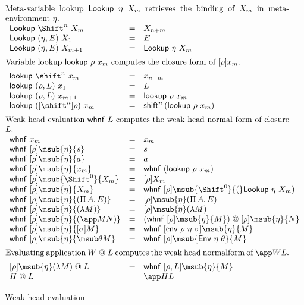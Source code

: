 \documentclass[copyright,creativecommons]{eptcs}
\makeatletter
\newcommand{\shiftby}[1]{\shift^{#1}}
\newcommand{\Shiftby}[1]{\Shift^{#1}}
\newcommand{\mId}{\Shiftby 0}
\newcommand{\esub}[1]{[#1]}
\newcommand{\msubp}[2]{\msub{#1}(#2)}
\newcommand{\dsub}[3]{\esub{#1}{\msub{#2}{#3}}} \newcommand{\dsubp}[3]{\esub{#1}{\msubp{#2}{#3}}} \newcommand{\fun}[1]{\Pi\,#1.\,}
\newcommand{\aboxiii}[1]{\multicolumn 3 {@{}p{\textwidth}@{}} {#1}}
\newcommand{\tlookup}{\mathsf{lookup}}
\newcommand{\wlookup}[2]{\tlookup~#1~{x_{#2}}}
\newcommand{\wlookupp}[2]{\wlookup{(#1)}{#2}}
\newcommand{\tLookup}{\mathsf{Lookup}}
\newcommand{\wmlookup}[2]{\tLookup~#1~{X_{#2}}}
\newcommand{\wmlookupp}[2]{\wmlookup{(#1)}{#2}}
\newcommand{\twhnf}{\mathsf{whnf}}
\newcommand{\twhnfp}[1]{\twhnf~(#1)}
\newcommand{\whnf}[3]{\twhnf~\dsub{#1}{#2}{#3}}
\newcommand{\whnfp}[3]{\whnf{#1}{#2}{(#3)}}
\newcommand{\twsub}{\mathsf{env}}
\newcommand{\wsub}[3]{\twsub~#1~#2~#3}
\newcommand{\twmsub}{\mathsf{Env}}
\newcommand{\wmsub}[2]{\twmsub~#1~#2}
\newcommand{\tshift}{\mathsf{shift}}
\newcommand{\shiftClos}[1]{\tshift^{#1}\,}
\newcommand{\shiftClosp}[2]{\shiftClos{#1}{(#2)}}
\newcommand{\wapp}[2]{#1 \mathrel{@} #2}
\makeatother
\begin{document}
\begin{figure}
\[\begin{array}{lll}
\\[0.5em]
\aboxiii{Meta-variable lookup $\wmlookup \eta m$ retrieves the binding of $X_m$ in meta-environment $\eta$.}\\[0.5em]
  \wmlookup  {\Shiftby n} m & = & X_{n+m} \\
  \wmlookupp {\eta, E}    1 & = & E \\
  \wmlookupp {\eta, E}{m+1} & = & \wmlookup \eta m
\\[0.5em]
\aboxiii{Variable lookup $\wlookup \rho m$ computes the closure form of $\esub \rho {x_m}$.} 
\\[0.5em]
  \wlookup  {\shiftby n} m & = & x_{n+m} \\
  \wlookupp {\rho, L}  1   & = & L \\
  \wlookupp {\rho, L}             {m+1} & = & \wlookup \rho m \\
  \wlookupp {\esub {\shiftby n} \rho} m & = & \shiftClosp n {\wlookup \rho m} 
\\[0.5em]
\aboxiii{Weak head evaluation $\twhnf~L$ computes the weak head normal
form of closure $L$.}
\\[0.5em]
  \twhnf~x_m         & = & x_m \\
  \whnf  \rho \eta s & = & s \\
  \whnf  \rho \eta a & = & a\\
  \whnf  \rho \eta {x_m} & = & \twhnfp {\wlookup \rho m} \\  
  \whnf  \rho \mId {X_m} & = & \esub \rho {X_m} \\
  \whnf  \rho \eta {X_m} & = & \whnf \rho \mId (\wmlookup \eta m) \\
  \whnfp \rho \eta {\fun A E} & = & \dsubp \rho \eta {\fun A E} \\
  \whnfp \rho \eta {\lambda M} & = & \dsubp \rho \eta {\lambda M} \\
  \whnfp \rho \eta {\app M N}  & = & 
    \wapp{(\whnf \rho \eta M)}{\dsub \rho \eta N}\\
  \whnf \rho \eta {\esub \sigma M} & = & 
    \whnf {\wsub \rho \eta \sigma} \eta M\\
  \whnf \rho \eta {\msub \theta M} & = & \whnf \rho {\wmsub \eta \theta} M
\\[0.5em]
\aboxiii{Evaluating application $\wapp W L$ computes the weak head
  normalform of $\app W L$.}
\\[0.5em]
  \wapp {\dsubp \rho \eta {\lambda M}} L & = & \whnf {\rho, L} \eta
  M \\
  \wapp H L & = & \app H L 
\end{array}
\]

  \caption{Weak head evaluation}
  \label{fig:sub2env}
\end{figure}
\end{document}
